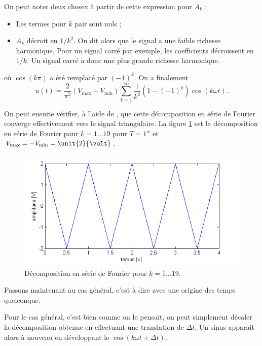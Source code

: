 \begin{correction}
	On peut noter deux chosex à partir de cette
	expression pour $A_k$ :
	\begin{itemize}
		\item Les termes pour $k$ pair sont nuls ;
		\item $A_k$ décroit en $1/k^2$. On dit alors
		que le signal a une faible richesse harmonique.
		Pour un signal carré par exemple, les coefficients
		décroissent en $1/k$. Un signal carré a donc une
		plus grande richesse harmonique.
	\end{itemize}
\end{correction}

où $\cos(k\pi)$ a été remplacé par $(-1)^k$.
On a finalement
\[ u(t) = \frac{2}{\pi^2}(V_{\text{max}}-V_{\text{min}})
\sum_{k=1}^{\infty} \frac{1}{k^2}(1 - (-1)^k)\cos(k\omega t).\]

On peut ensuite vérifier, à l'aide de \matlab,
que cette décomposition en série de Fourier
converge effectivement vers le signal triangulaire.
La figure \ref{fig:q1-fourier-19} est la décomposition
en série de Fourier pour $k = 1\dots19$ pour 
$T = \unit{1}{\second}$ et $V_{\text{max}} = 
-V_{\text{min}} = \unit{2}{\volt}$.

\begin{figure}[ht]
	\centering
	\includegraphics[scale=0.6]{img/q1-fourier-19.png}
	\caption{Décomposition en série de Fourier pour $k=1\dots19$.}
	\label{fig:q1-fourier-19}
\end{figure}

Passons maintenant au cas général, c'est à
dire avec une origine des temps quelconque.

\begin{correction}
	Pour le cas général, c'est bien comme
	on le pensait, on peut simplement décaler
	la décomposition obtenue en effectuant une
	translation de $\Delta t$. Un sinus
	apparait alors à nouveau en développant
	le $\cos(k\omega t + \Delta t)$.
\end{correction}

